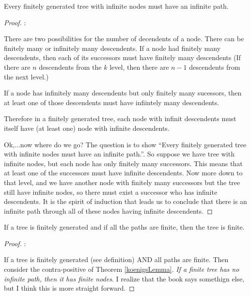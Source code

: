 \newpage
\begin{mytheorem}
Every finitely generated tree with infinite nodes must have an infinite path.\label{koenigsLemma}
\begin{proof}:

\ifKey
\hfill \begin{minipage}{0.75\textwidth}
\color{red} There are two possibilities for the number of decendents of a node.  There can be finitely many or infinitely many descendents.  If a node had finitely many descendents, then each of its successors must have finitely many descendents (If there are $n$ descendents from the $k$ level, then there are $n-1$ descendents from the next level.) 

If a node has infinitely many descendents  but only finitely many sucessors, then at least one of those descendents must have infiintely many descendents.

Therefore in a finitely generated tree, each node with infinit descendents must itself have (at least one) node with infinite descendents.

Ok,...now where do we go?  The question is to show ``Every finitely generated tree with infinite nodes must have an infinite path.''.  So suppose we have  tree with infinite nodes, but each node has only finitely many successors.  This means that at least one of the successors must have infinite descendents.  Now more down to that level, and we have another node with finitely many successors but the tree still have infinite nodes, so there must exist a successor who has infinite descendents.  It is the spirit of induction that leads us to conclude that there is an infinite path through all of these nodes having infinite descendents.
\end{minipage}
\color{black}
\fi

\end{proof}

\end{mytheorem}

\begin{mytheorem}
If a tree is finitely generated and if all the paths are finite, then the tree is finite.
\begin{proof}:


\ifKey
\hfill \begin{minipage}{0.75\textwidth}
\color{red} If a tree is finitely generated (see definition) AND all paths are finite.  Then consider the contra-positive of Theorem \ref{koenigsLemma}.
\emph{If a finite tree has no infinite path, then it has finite nodes}.  I realize that the book says somethign else, but I think this is more straight forward.

\end{minipage}
\color{black}
\fi

\end{proof}
\end{mytheorem}

